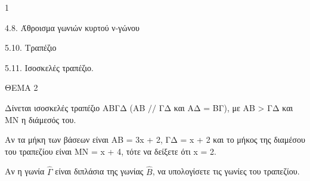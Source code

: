\begin{ylh}{1}
    \item 4.8. Άθροισμα γωνιών κυρτού ν-γώνου
    \item 5.10. Τραπέζιο
    \item 5.11. Ισοσκελές τραπέζιο.
\end{ylh}

ΘΕΜΑ 2

Δίνεται ισοσκελές τραπέζιο ΑΒΓΔ (ΑΒ $\slash \slash$ ΓΔ και ΑΔ = ΒΓ), με ΑΒ \textgreater{} ΓΔ και ΜΝ η διάμεσός του.

\begin{alist}
\item Αν τα μήκη των βάσεων είναι ΑΒ = 3x + 2, ΓΔ = x + 2 και το μήκος της διαμέσου του τραπεζίου είναι ΜΝ = x + 4, τότε να δείξετε ότι x = 2. 

\item Αν η γωνία $\widehat{\Gamma}$ είναι διπλάσια της γωνίας $\widehat{Β}$, να υπολογίσετε τις γωνίες του τραπεζίου. 


\begin{center}
\end{center}
\end{alist}

